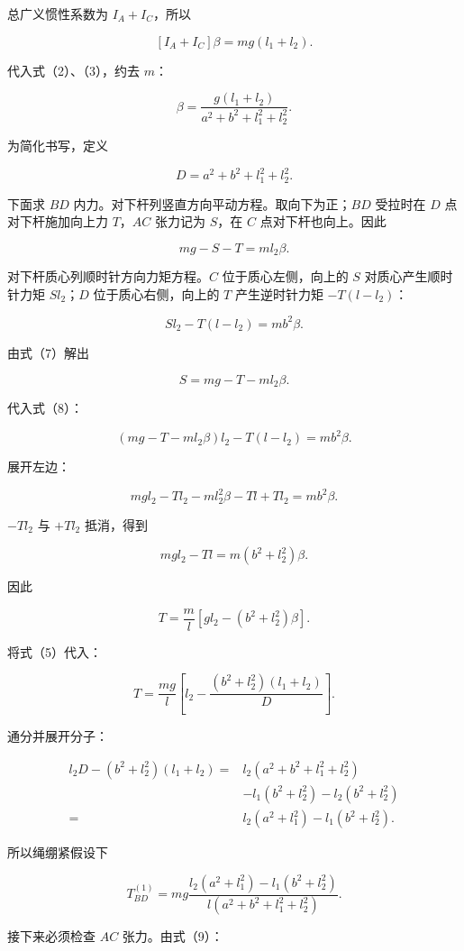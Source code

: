 \documentclass[12pt,a4paper,UTF8]{ctexart}
\begin{document}
总广义惯性系数为 \(I_A+I_C\)，所以

\[
[I_A+I_C]\beta=mg(l_1+l_2). \tag{4}
\]

代入式（2）、（3），约去 \(m\)：

\[
\boxed{\beta=
\frac{g(l_1+l_2)}{a^2+b^2+l_1^2+l_2^2}}. \tag{5}
\]

为简化书写，定义

\[
D=a^2+b^2+l_1^2+l_2^2. \tag{6}
\]

下面求 \(BD\) 内力。对下杆列竖直方向平动方程。取向下为正；\(BD\)
受拉时在 \(D\) 点对下杆施加向上力 \(T\)，\(AC\) 张力记为 \(S\)，在 \(C\)
点对下杆也向上。因此

\[
mg-S-T=m l_2\beta. \tag{7}
\]

对下杆质心列顺时针方向力矩方程。\(C\) 位于质心左侧，向上的 \(S\)
对质心产生顺时针力矩 \(Sl_2\)；\(D\) 位于质心右侧，向上的 \(T\)
产生逆时针力矩 \(-T(l-l_2)\)：

\[
S l_2-T(l-l_2)=mb^2\beta. \tag{8}
\]

由式（7）解出

\[
S=mg-T-ml_2\beta. \tag{9}
\]

代入式（8）：

\[
(mg-T-ml_2\beta)l_2-T(l-l_2)=mb^2\beta. \tag{10}
\]

展开左边：

\[
mgl_2-Tl_2-ml_2^2\beta-Tl+Tl_2=mb^2\beta. \tag{11}
\]

\(-Tl_2\) 与 \(+Tl_2\) 抵消，得到

\[
mgl_2-Tl=m(b^2+l_2^2)\beta. \tag{12}
\]

因此

\[
T=\frac m l\left[gl_2-(b^2+l_2^2)\beta\right]. \tag{13}
\]

将式（5）代入：

\[
T=\frac{mg}{l}
\left[l_2-\frac{(b^2+l_2^2)(l_1+l_2)}D\right]. \tag{14}
\]

通分并展开分子：

\[
\begin{aligned}
l_2D-(b^2+l_2^2)(l_1+l_2)
={}&l_2(a^2+b^2+l_1^2+l_2^2)\\
&-l_1(b^2+l_2^2)-l_2(b^2+l_2^2)\\
={}&l_2(a^2+l_1^2)-l_1(b^2+l_2^2).
\end{aligned} \tag{15}
\]

所以绳绷紧假设下

\[
\boxed{
T_{BD}^{(1)}=
mg\frac{l_2(a^2+l_1^2)-l_1(b^2+l_2^2)}
{l(a^2+b^2+l_1^2+l_2^2)} }. \tag{16}
\]

接下来必须检查 \(AC\) 张力。由式（9）：
\end{document}
